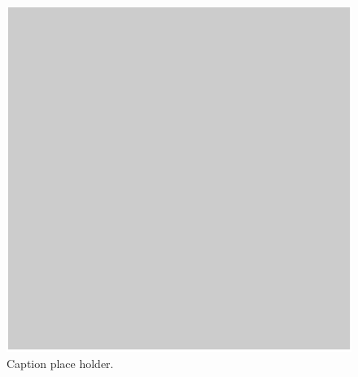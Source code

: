 \documentclass[a4paper,fleqn]{cas-dc}
\begin{document}
\begin{figure}[t]
	\centering
	\includegraphics[scale=1]{figs/Fig1.pdf}
	\caption{Caption place holder.}
	\label{FIG:1}
\end{figure}

\end{document}
